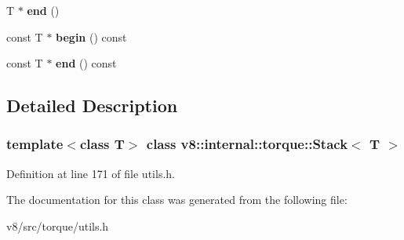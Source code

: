 \begin{DoxyCompactItemize}
\item 
\mbox{\label{classv8_1_1internal_1_1torque_1_1Stack_a563acdec152f7863da2207838511da5b}} 
T $\ast$ {\bfseries end} ()
\item 
\mbox{\label{classv8_1_1internal_1_1torque_1_1Stack_a6c231b49e086244ce14bb2f3d521df4b}} 
const T $\ast$ {\bfseries begin} () const
\item 
\mbox{\label{classv8_1_1internal_1_1torque_1_1Stack_ab778ad93d4b9900fb45732d057aa0d2b}} 
const T $\ast$ {\bfseries end} () const
\end{DoxyCompactItemize}


\subsection{Detailed Description}
\subsubsection*{template$<$class T$>$\newline
class v8\+::internal\+::torque\+::\+Stack$<$ T $>$}



Definition at line 171 of file utils.\+h.



The documentation for this class was generated from the following file\+:\begin{DoxyCompactItemize}
\item 
v8/src/torque/utils.\+h\end{DoxyCompactItemize}
